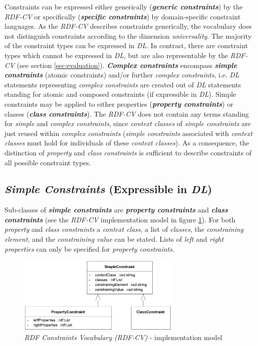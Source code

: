 \documentclass{llncs}
\begin{document}
Constraints can be expressed either generically (\textbf{\emph{generic constraints}}) by the \emph{RDF-CV}   
or specifically (\textbf{\emph{specific constraints}}) by domain-specific constraint languages.
As the \emph{RDF-CV} describes constraints generically, the vocabulary does not distinguish constraints according to the dimension \emph{universality}. 
The majority of the constraint types can be expressed in \emph{DL}.
In contrast, there are constraint types which cannot be expressed in \emph{DL}, but are also representable by the \emph{RDF-CV} (see section \ref{sec:evaluation}). 
\textbf{\emph{Complex constraints}} encompass \textbf{\emph{simple constraints}} (atomic constraints) and/or further \emph{complex constraints},
i.e. \emph{DL} statements representing \emph{complex constraints} are created out of \emph{DL} statements standing for atomic and composed constraints (if expressible in \emph{DL}). 
Simple constraints may be applied to either properties (\textbf{\emph{property constraints}}) or classes (\textbf{\emph{class constraints}}).
The \emph{RDF-CV} does not contain any terms standing for \emph{simple} and \emph{complex constraints}, since \emph{context classes} of \emph{simple constraints} are just reused within \emph{complex constraints} (\emph{simple constraints} associated with \emph{context classes} must hold for individuals of these \emph{context classes}).
As a consequence, the distinction of \emph{property} and \emph{class constraints} is sufficient to describe constraints of all possible constraint types.

\subsection{\emph{Simple Constraints} (Expressible in \emph{DL})}

Sub-classes of \textbf{\emph{simple constraints}} are \textbf{\emph{property constraints}} and \textbf{\emph{class constraints}} (see the \emph{RDF-CV} implementation model in figure \ref{fig:RDF-CV-implementation-model}). 
For both \emph{property} and \emph{class constraints} a \emph{context class}, a list of \emph{classes}, the \emph{constraining element}, and the \emph{constraining value} can be stated. 
Lists of \emph{left} and \emph{right properties} can only be specified for \emph{property constraints}.

\begin{figure}
	\centering
		\includegraphics[width=0.70\textwidth]{images/RDF-CV-implementation-model.png}
	\caption{\emph{RDF Constraints Vocabulary (RDF-CV)} - implementation model}
	\label{fig:RDF-CV-implementation-model}
\end{figure}
\end{document}
